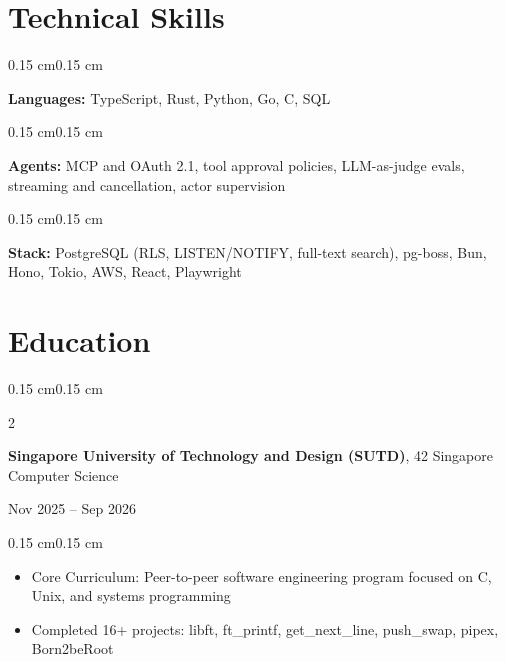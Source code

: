 \documentclass[10pt, letterpaper]{article}
\newenvironment{highlights}{
    \begin{itemize}[
        topsep=0.08 cm,
        parsep=0.05 cm,
        partopsep=0pt,
        itemsep=0pt,
        leftmargin=0.4 cm
    ]
}{
    \end{itemize}
}
\newenvironment{onecolentry}{
    \begin{adjustwidth}{0.15 cm}{0.15 cm}
}{
    \end{adjustwidth}
}
\newenvironment{twocolentry}[2][]{
    \onecolentry
    \def\secondColumn{#2}
    \setcolumnwidth{\fill, 4.5 cm}
    \begin{paracol}{2}
}{
    \switchcolumn \raggedleft \secondColumn
    \end{paracol}
    \endonecolentry
}
\begin{document}
    \section{Technical Skills}
        \begin{onecolentry}
            \textbf{Languages:} TypeScript, Rust, Python, Go, C, SQL
        \end{onecolentry}

        \vspace{0.07 cm}

        \begin{onecolentry}
            \textbf{Agents:} MCP and OAuth 2.1, tool approval policies, LLM-as-judge evals, streaming and cancellation, actor supervision
        \end{onecolentry}

        \vspace{0.07 cm}

        \begin{onecolentry}
            \textbf{Stack:} PostgreSQL (RLS, LISTEN/NOTIFY, full-text search), pg-boss, Bun, Hono, Tokio, AWS, React, Playwright
        \end{onecolentry}

    \section{Education}

        \begin{twocolentry}{
            Nov 2025 -- Sep 2026
        }
            \textbf{Singapore University of Technology and Design (SUTD)}, 42 Singapore Computer Science
        \end{twocolentry}  
        \vspace{0.08 cm}
        \begin{onecolentry}
            \begin{highlights}
                \item Core Curriculum: Peer-to-peer software engineering program focused on C, Unix, and systems programming
                \item Completed 16+ projects: libft, ft\_printf, get\_next\_line, push\_swap, pipex, Born2beRoot
            \end{highlights}
        \end{onecolentry}

        \vspace{0.15 cm}
\end{document}

